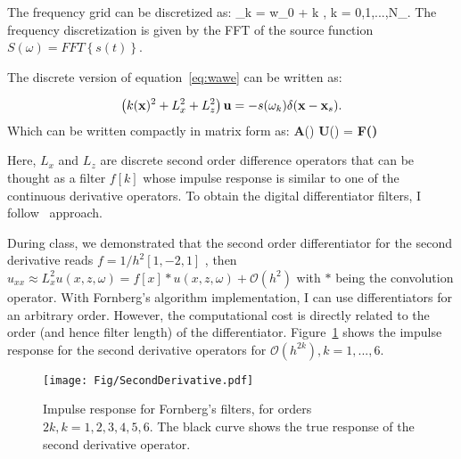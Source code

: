 \documentclass[10pt]{article}
\begin{document}
The frequency grid can be discretized as:
\beq
\omega_k = w_0 + k \delta\omega,   k = 0,1,...,N_\omega.
\eeq
The frequency discretization is given by the FFT of the source function $S(\omega) = FFT\left\{s(t)\right\}$.

The discrete version of equation~\ref{eq:wawe} can be written as: 

\[
\left(k({\bf x})^2 + L_x^2 + L_z^2 \right)  {\bf u}  = -s(\omega_k)\delta({\bf x}-{\bf x}_s).
\]
Which can be written compactly in matrix form as:
\beq
 {\bf A}(\omega) {\bf U}(\omega) = {\bf F(\omega)}
\eeq

Here, $L_x$ and $L_z$ are discrete second order difference operators that can be thought as a filter $f[k]$ whose
impulse response is similar to one of the continuous derivative operators. To obtain the digital differentiator
filters, I follow~\cite{Fornberg88} approach.

During class, we demonstrated that the second order differentiator for the second derivative 
reads $f = 1/h^2[1,-2,1]$ , then $u_{xx} \approx L_x^2 u(x,z,\omega) = f[x]*u(x,z,\omega) + \mathcal{O}(h^2)$ with $*$ being the convolution operator. 
With Fornberg's algorithm implementation, I can use differentiators  for an arbitrary order. However, 
the computational cost is directly related to the order (and hence filter length) of the differentiator. Figure~\ref{fig:d2} shows the impulse 
response for the second derivative operators for $\mathcal{O}(h^{2k}), k=1,...,6$.

\begin{figure}
\centering
\texttt{[image: Fig/SecondDerivative.pdf]}
\caption{Impulse response for Fornberg's filters, for orders $2k, k =1,2,3,4,5,6$. The black curve shows the true
        response of the second derivative operator.}
\label{fig:d2}
\end{figure}
\end{document}
